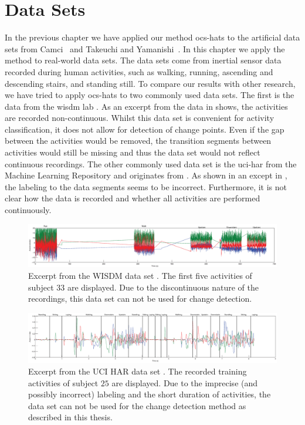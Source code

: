 \section{Data Sets}\label{sec:data_sets}
In the previous chapter we have applied our method \gls{ocs-hats} to the artificial data sets from Camci~\cite{camci2010change} and Takeuchi and Yamanishi~\cite{takeuchi2006unifying}.
In this chapter we apply the method to real-world data sets.
The data sets come from inertial sensor data recorded during human activities, such as walking, running, ascending and descending stairs, and standing still.
To compare our results with other research, we have tried to apply \gls{ocs-hats} to two commonly used data sets.
The first is the data from the \gls{wisdm} lab \cite{kwapisz2011activity}.
As an excerpt from the data in  shows, the activities are recorded non-continuous.
Whilst this data set is convenient for activity classification, it does not allow for detection of change points.
Even if the gap between the activities would be removed, the transition segments between activities would still be missing and thus the data set would not reflect continuous recordings.
The other commonly used data set is the \gls{uci-har} from the Machine Learning Repository and originates from \cite{anguita2012human}.
As shown in an except in , the labeling to the data segments seems to be incorrect.
Furthermore, it is not clear how the data is recorded and whether all activities are performed continuously.

\begin{figure}
\centering
  \includegraphics[width=1\textwidth]{./Figures/Chapter6/data_collection/wisdm_excerpt.eps}
  \caption[WISDM Excerpt]{Excerpt from the WISDM data set \cite{kwapisz2011activity}. The first five activities of subject $33$ are displayed. Due to the discontinuous nature of the recordings, this data set can not be used for change detection.}
  \label{fig:wisdm_excerpt}
\end{figure}

\begin{figure}
\centering
  \includegraphics[width=1\textwidth]{./Figures/Chapter6/data_collection/uci_annotated.eps}
  \caption[UCI HAR Excerpt]{Excerpt from the UCI HAR data set \cite{anguita2012human}. The recorded training activities of subject $25$ are displayed. Due to the imprecise (and possibly incorrect) labeling and the short duration of activities, the data set can not be used for the change detection method as described in this thesis.}
  \label{fig:uci_annotated}
\end{figure}

